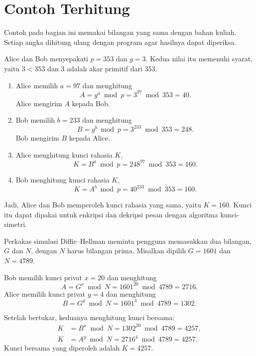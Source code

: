 \section{Contoh Terhitung}
\label{sec:contoh-dh}


Contoh pada bagian ini memakai bilangan yang sama dengan bahan kuliah. Setiap
angka dihitung ulang dengan program agar hasilnya dapat diperiksa.

\begin{example}[Pertukaran kunci dengan $p = 353$ dan $g = 3$]
\label{ex:dh-353}
Alice dan Bob menyepakati $p = 353$ dan $g = 3$. Kedua nilai itu memenuhi
syarat, yaitu $3 < 353$ dan $3$ adalah akar primitif dari $353$.

\begin{enumerate}
    \item Alice memilih $a = 97$ dan menghitung
          \[ A = g^a \bmod p = 3^{97} \bmod 353 = 40 . \]
          Alice mengirim $A$ kepada Bob.
    \item Bob memilih $b = 233$ dan menghitung
          \[ B = g^b \bmod p = 3^{233} \bmod 353 = 248 . \]
          Bob mengirim $B$ kepada Alice.
    \item Alice menghitung kunci rahasia $K$,
          \[ K = B^a \bmod p = 248^{97} \bmod 353 = 160 . \]
    \item Bob menghitung kunci rahasia $K$,
          \[ K = A^b \bmod p = 40^{233} \bmod 353 = 160 . \]
\end{enumerate}

Jadi, Alice dan Bob memperoleh kunci rahasia yang sama, yaitu $K = 160$.
Kunci itu dapat dipakai untuk enkripsi dan dekripsi pesan dengan algoritma
kunci-simetri.
\end{example}

\begin{example}
\label{ex:dh-1601}
Perkakas simulasi Diffie--Hellman meminta pengguna memasukkan dua bilangan,
$G$ dan $N$, dengan $N$ harus bilangan prima. Misalkan dipilih $G = 1601$ dan
$N = 4789$.

Bob memilih kunci privat $x = 20$ dan menghitung
\[ A = G^{x} \bmod N = 1601^{20} \bmod 4789 = 2716 . \]
Alice memilih kunci privat $y = 4$ dan menghitung
\[ B = G^{y} \bmod N = 1601^{4} \bmod 4789 = 1302 . \]

Setelah bertukar, keduanya menghitung kunci bersama:
\[
\begin{aligned}
K &= B^{x} \bmod N = 1302^{20} \bmod 4789 = 4257, \\
K &= A^{y} \bmod N = 2716^{4} \bmod 4789 = 4257 .
\end{aligned}
\]
Kunci bersama yang diperoleh adalah $K = 4257$.
\end{example}
